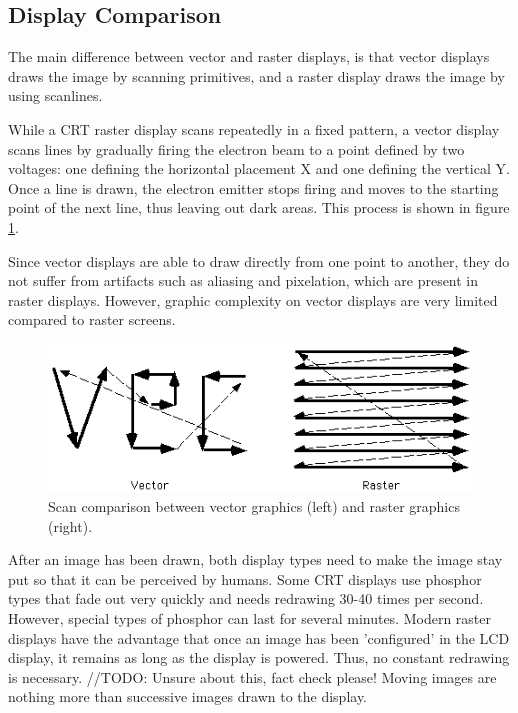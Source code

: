 \subsection{Display Comparison}
The main difference between vector and raster displays, is that vector displays draws the image by scanning primitives, and a raster display draws the image by using scanlines. 

While a CRT raster display scans repeatedly in a fixed pattern, a vector display scans lines by gradually firing the electron beam to a point defined by two voltages: one defining the horizontal placement X and one defining the vertical Y. 
Once a line is drawn, the electron emitter stops firing and moves to the starting point of the next line, thus leaving out dark areas. 
This process is shown in figure \ref{fig:vectorscan}.

Since vector displays are able to draw directly from one point to another, they do not suffer from artifacts such as aliasing and pixelation, which are present in raster displays\cite{vector-monitor}.
However, graphic complexity on vector displays are very limited compared to raster screens.

\begin{figure}[h!]
\centering \includegraphics[width=0.8\linewidth]{images/scan.png}
\caption{Scan comparison between vector graphics (left) and raster graphics (right)\cite{vecvsras}.}
\label{fig:vectorscan}
\end{figure}

After an image has been drawn, both display types need to make the image stay put so that it can be perceived by humans. 
Some CRT displays use phosphor types that fade out very quickly and needs redrawing 30-40 times per second\cite{vector-monitor}.
However, special types of phosphor can last for several minutes.
Modern raster displays have the advantage that once an image has been 'configured' in the LCD display, it remains as long as the display is powered. 
Thus, no constant redrawing is necessary. //TODO: Unsure about this, fact check please!
Moving images are nothing more than successive images drawn to the display.

